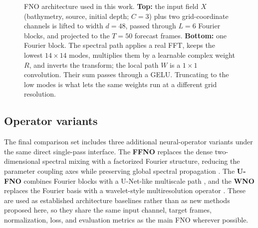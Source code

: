 \begin{figure}[H]
\caption{FNO architecture used in this work. \textbf{Top:} the input field $X$ (bathymetry, source, initial depth; $C{=}3$) plus two grid-coordinate channels is lifted to width $d{=}48$, passed through $L{=}6$ Fourier blocks, and projected to the $T{=}50$ forecast frames. \textbf{Bottom:} one Fourier block. The spectral path applies a real FFT, keeps the lowest $14{\times}14$ modes, multiplies them by a learnable complex weight $R$, and inverts the transform; the local path $W$ is a $1{\times}1$ convolution. Their sum passes through a GELU. Truncating to the low modes is what lets the same weights run at a different grid resolution.}
\label{fig:fno-arch}
\end{figure}

\subsection{Operator variants}
\label{subsec:operator-variants}

The final comparison set includes three additional neural-operator variants under the same direct single-pass interface. The \textbf{FFNO} replaces the dense two-dimensional spectral mixing with a factorized Fourier structure, reducing the parameter coupling axes while preserving global spectral propagation \citep{tran2023ffno}. The \textbf{U-FNO} combines Fourier blocks with a U-Net-like multiscale path \citep{wen2022ufno}, and the \textbf{WNO} replaces the Fourier basis with a wavelet-style multiresolution operator \citep{tripura2023wno}. These are used as established architecture baselines rather than as new methods proposed here, so they share the same input channel, target frames, normalization, loss, and evaluation metrics as the main FNO wherever possible.


